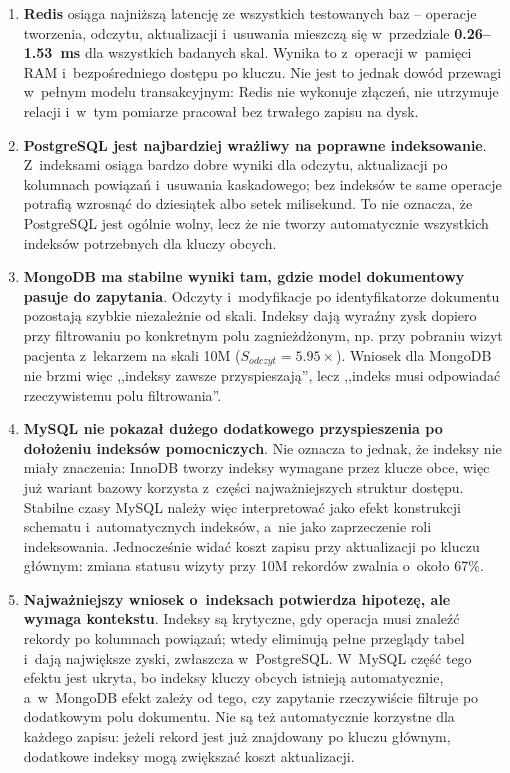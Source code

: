 \documentclass[12pt,a4paper]{article}
\begin{document}
\begin{enumerate}
    \item \textbf{Redis} osiąga najniższą latencję ze wszystkich testowanych baz -- operacje tworzenia, odczytu, aktualizacji i~usuwania mieszczą się w~przedziale \textbf{0.26--1.53~ms} dla wszystkich badanych skal. Wynika to z~operacji w~pamięci RAM i~bezpośredniego dostępu po kluczu. Nie jest to jednak dowód przewagi w~pełnym modelu transakcyjnym: Redis nie wykonuje złączeń, nie utrzymuje relacji i~w~tym pomiarze pracował bez trwałego zapisu na dysk.

    \item \textbf{PostgreSQL jest najbardziej wrażliwy na poprawne indeksowanie}. Z~indeksami osiąga bardzo dobre wyniki dla odczytu, aktualizacji po kolumnach powiązań i~usuwania kaskadowego; bez indeksów te same operacje potrafią wzrosnąć do dziesiątek albo setek milisekund. To nie oznacza, że PostgreSQL jest ogólnie wolny, lecz że nie tworzy automatycznie wszystkich indeksów potrzebnych dla kluczy obcych.

    \item \textbf{MongoDB ma stabilne wyniki tam, gdzie model dokumentowy pasuje do zapytania}. Odczyty i~modyfikacje po identyfikatorze dokumentu pozostają szybkie niezależnie od skali. Indeksy dają wyraźny zysk dopiero przy filtrowaniu po konkretnym polu zagnieżdżonym, np. przy pobraniu wizyt pacjenta z~lekarzem na skali 10M ($S_{odczyt}=5.95\times$). Wniosek dla MongoDB nie brzmi więc ,,indeksy zawsze przyspieszają'', lecz ,,indeks musi odpowiadać rzeczywistemu polu filtrowania''.

    \item \textbf{MySQL nie pokazał dużego dodatkowego przyspieszenia po dołożeniu indeksów pomocniczych}. Nie oznacza to jednak, że indeksy nie miały znaczenia: InnoDB tworzy indeksy wymagane przez klucze obce, więc już wariant bazowy korzysta z~części najważniejszych struktur dostępu. Stabilne czasy MySQL należy więc interpretować jako efekt konstrukcji schematu i~automatycznych indeksów, a~nie jako zaprzeczenie roli indeksowania. Jednocześnie widać koszt zapisu przy aktualizacji po kluczu głównym: zmiana statusu wizyty przy 10M rekordów zwalnia o~około 67\%.

    \item \textbf{Najważniejszy wniosek o~indeksach potwierdza hipotezę, ale wymaga kontekstu}. Indeksy są krytyczne, gdy operacja musi znaleźć rekordy po kolumnach powiązań; wtedy eliminują pełne przeglądy tabel i~dają największe zyski, zwłaszcza w~PostgreSQL. W~MySQL część tego efektu jest ukryta, bo indeksy kluczy obcych istnieją automatycznie, a~w~MongoDB efekt zależy od tego, czy zapytanie rzeczywiście filtruje po dodatkowym polu dokumentu. Nie są też automatycznie korzystne dla każdego zapisu: jeżeli rekord jest już znajdowany po kluczu głównym, dodatkowe indeksy mogą zwiększać koszt aktualizacji.


\end{enumerate}
\end{document}
